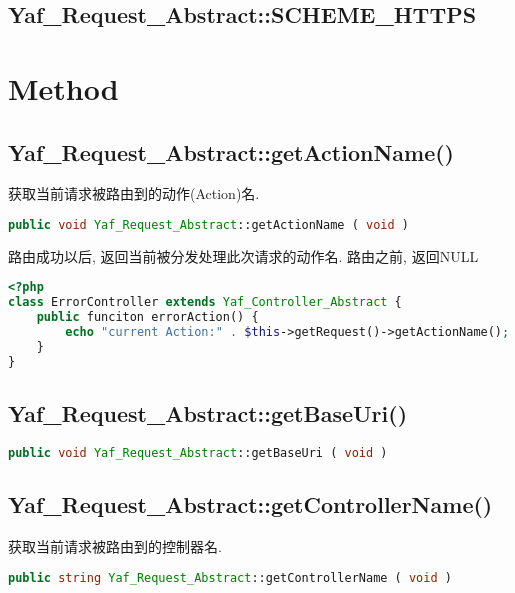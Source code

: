 \subsection{Yaf\_Request\_Abstract::SCHEME\_HTTPS}

\section{Method}


\subsection{Yaf\_Request\_Abstract::getActionName()}



获取当前请求被路由到的动作(Action)名.




\begin{lstlisting}[language=PHP]
public void Yaf_Request_Abstract::getActionName ( void )
\end{lstlisting}

路由成功以后, 返回当前被分发处理此次请求的动作名. 路由之前, 返回NULL


\begin{lstlisting}[language=PHP]
<?php
class ErrorController extends Yaf_Controller_Abstract {
    public funciton errorAction() {
        echo "current Action:" . $this->getRequest()->getActionName();
    }
}
\end{lstlisting}


\subsection{Yaf\_Request\_Abstract::getBaseUri()}




\begin{lstlisting}[language=PHP]
public void Yaf_Request_Abstract::getBaseUri ( void )
\end{lstlisting}




\subsection{Yaf\_Request\_Abstract::getControllerName()}

获取当前请求被路由到的控制器名.

\begin{lstlisting}[language=PHP]
public string Yaf_Request_Abstract::getControllerName ( void )
\end{lstlisting}

